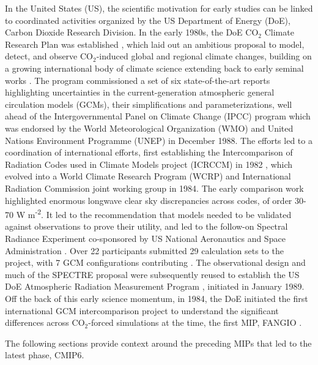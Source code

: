 \documentclass[gmd, preprint]{copernicus}
\begin{document}
In the United States (US), the scientific motivation for early studies can be linked to coordinated activities organized by the US Department of Energy (DoE), Carbon Dioxide Research Division. In the early 1980s, the DoE CO$_{2}$ Climate Research Plan was established \citep{riches_co2_1983}, which laid out an ambitious proposal to model, detect, and observe CO$_{2}$-induced global and regional climate changes, building on a growing international body of climate science extending back to early seminal works \citep[e.g.,][]{arrhenius_xxxi_1896,chamberlin_attempt_1899,charney_carbon_1979}. The program commissioned a set of six state-of-the-art reports \citep[e.g.,][]{maccracken_projecting_1985} highlighting uncertainties in the current-generation atmospheric general circulation models (GCMs), their simplifications and parameterizations, well ahead of the Intergovernmental Panel on Climate Change (IPCC) program which was endorsed by the World Meteorological Organization (WMO) and United Nations Environment Programme (UNEP) in December 1988. The efforts led to a coordination of international efforts, first establishing the Intercomparison of Radiation Codes used in Climate Models project (ICRCCM) in 1982 \citep{luther_intercomparison_1988,ellingson_intercomparison_1991}, which evolved into a World Climate Research Program (WCRP) and International Radiation Commission joint working group in 1984. The early comparison work highlighted enormous longwave clear sky discrepancies across codes, of order 30-70 W m\textsuperscript{-2}. It led to the recommendation that models needed to be validated against observations to prove their utility, and led to the follow-on Spectral Radiance Experiment \citep[SPECTRE;][]{ellingson_icrccm_1990} co-sponsored by US National Aeronautics and Space Administration \citep[NASA;][]{ellingson_spectral_1996}. Over 22 participants submitted 29 calculation sets to the project, with 7 GCM configurations contributing \citep{ellingson_atmospheric_2016}. The observational design and much of the SPECTRE proposal were subsequently reused to establish the US DoE Atmospheric Radiation Measurement Program \citep[ARM;][]{us_department_of_energy_atmospheric_1990}, initiated in January 1989. Off the back of this early science momentum, in 1984, the DoE initiated the first international GCM intercomparison project to understand the significant differences across CO$_{2}$-forced simulations at the time, the first MIP, FANGIO \citep[see \autoref{sec:amip1And2};][]{ellingson_atmospheric_2016}.

The following sections provide context around the preceding MIPs that led to the latest phase, CMIP6.
\end{document}
